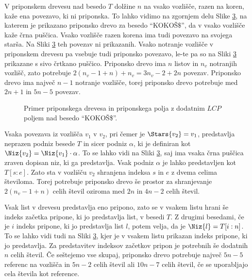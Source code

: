 V priponskem drevesu nad besedo $T$ dolžine $n$ na vsako vozlišče, razen na koren, kaže ena povezavo, ki ni priponska. To lahko vidimo na zgornjem delu Slike \ref{fig:SuffuxArray}, na katerem je prikazano priponsko drevo za besedo \enquote{KOKOŠ$\$$}, da v vsako vozlišče kaže črna puščica. Vsako vozlišče razen korena ima tudi povezavo na svojega starša. Na Sliki \ref{fig:SuffuxArray} teh povezav ni prikazanih. Vsako notranje vozlišče v priponskem drevesu pa vsebuje tudi priponsko povezavo, le-te pa so na Sliki \ref{fig:SuffuxArray} prikazane s sivo črtkano puščico. Priponsko drevo ima $n$ listov in $n_v$ notranjih vozlišč, zato potrebuje $2(n_v-1+n)+n_v= 3n_v-2+2n$ povezav. Priponsko drevo ima največ $n-1$ notranje vozlišče, torej priponsko drevo potrebuje med $2n+1$ in $5n -5$ povezav.

\begin{figure}[htb]
    \begin{subfigure}[t]{\linewidth}
        
        
        \centering
        \subcaption*{}
        \label{fig:bSADrevo}
    \end{subfigure}
    \begin{subfigure}[t]{1\linewidth}        
        
        \centering
        \subcaption*{}
        \label{fig:bSAPolje}
    \end{subfigure}
    \caption{Primer priponskega drevesa in priponskega polja z dodatnim $LCP$ poljem nad besedo \enquote{KOKOŠ\$}.} 
    \label{fig:SuffuxArray}
\end{figure}

Vsaka povezava iz vozlišča $v_1$ v $v_2$, pri čemer je $\Stars{v_2}=v_1$, predstavlja neprazen podniz besede $T$ in sicer podniz $\alpha$, ki je definiran kot $\Niz{v_2}=\Niz{v_1}\cdot\alpha$. To se lahko vidi na Sliki \ref{fig:SuffuxArray}, saj ima vsaka črna puščica zraven dopisan niz, ki ga predstavlja. Vsak podniz $\alpha$ je lahko predstavljen kot $T[s:e]$. Zato sta v vozlišču $v_2$ shranjena indeksa $s$ in $e$ z dvema celima številoma. Torej potrebuje priponsko drevo še prostor za shranjevanje $2(n_v-1+n)$ celih števil oziroma med $2n$ in $4n-2$ celih števil.

Vsak list v drevesu predstavlja eno pripono, zato se v vsakem listu hrani še indeks začetka pripone, ki jo predstavlja list, v besedi $T$. Z drugimi besedami, če je $i$ indeks pripone, ki jo predstavlja list $l$, potem velja, da je $\Niz{l}=T[i:n]$. To se lahko vidi tudi na Sliki \ref{fig:SuffuxArray}, kjer je v vsakem listu prikazan indeks pripone, ki jo predstavlja. Za predstavitev indeksov začetkov pripon je potrebnih še dodatnih $n$ celih števil. Če seštejemo vse skupaj, priponsko drevo potrebuje največ $5n-5$ referenc na vozlišča in $5n-2$ celih števil ali $10n-7$ celih števil, če se uporabljajo cela števila kot reference.

